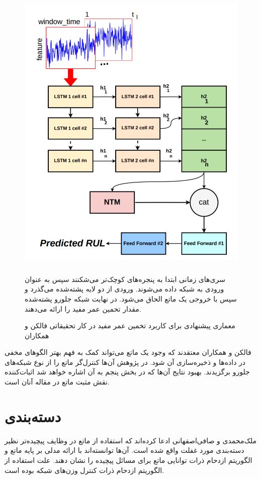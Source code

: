 \begin{figure}[!h]
\begin{center}
\includegraphics[height=14cm]{RUL.png}
\end{center}
\caption{معماری پیشنهادی برای کاربرد تخمین عمر مفید در کار تحقیقاتی فالکن و همکاران\cite{falcon2020neural}}
\medskip
\small
سری‌های زمانی ابتدا به پنجره‌های کوچک‌تر می‌شکنند سپس به عنوان ورودی به شبکه داده می‌شوند. ورودی از دو لایه  پشته‌شده می‌گذرد و سپس با خروجی یک ماتع الحاق می‌شود. در نهایت شبکه جلورو پشته‌شده مقدار تحمین عمر مفید را ارائه می‌دهند. 
\end{figure}

فالکن و همکاران معتقدند که وجود یک ماتع می‌تواند کمک به فهم بهتر الگوهای مخفی در داده‌ها و ذخیره‌سازی آن شود. در پژوهش آن‌ها کنترل‌گر ماتع را از نوع شبکه‌های جلورو برگزیدند.\cite{falcon2020neural} بهبود نتایج آن‌ها که در بخش پنجم به آن اشاره خواهد شد اثبات‌کننده نقش مثبت ماتع در مقاله آنان است.

\section{دسته‌بندی}
ملک‌محمدی و صافی‌اصفهانی ادعا کرده‌اند که استفاده از ماتع در وظایف پیچیده‌تر نظیر دسته‌بندی مورد غفلت واقع شده است. آن‌ها توانسته‌اند با ارائه مدلی بر پایه ماتع و الگوریتم ازدحام ذرات توانایی ماتع برای مسائل پیچیده را نشان دهند. علت استفاده از الگوریتم ازدحام ذرات کنترل وزن‌های شبکه بوده است.\cite{faradonbe2020classifier}
\\

